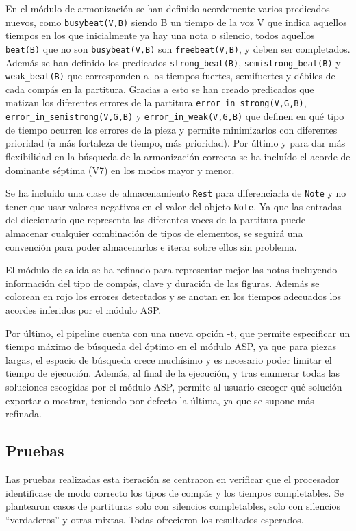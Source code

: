 En el módulo de armonización se han definido acordemente varios predicados nuevos, como \texttt{busybeat(V,B)} siendo B un tiempo de la voz V que indica aquellos tiempos en los que inicialmente ya hay una nota o silencio, todos aquellos \texttt{beat(B)} que no son \texttt{busybeat(V,B)} son \texttt{freebeat(V,B)}, y deben ser completados. Además se han definido los predicados \texttt{strong\_beat(B)}, \texttt{semistrong\_beat(B)} y \texttt{weak\_beat(B)} que corresponden a los tiempos fuertes, semifuertes y débiles de cada compás en la partitura. Gracias a esto se han creado predicados que matizan los diferentes errores de la partitura \texttt{error\_in\_strong(V,G,B)}, \texttt{error\_in\_semistrong(V,G,B)} y \texttt{error\_in\_weak(V,G,B)} que definen en qué tipo de tiempo ocurren los errores de la pieza y permite minimizarlos con diferentes prioridad (a más fortaleza de tiempo, más prioridad). Por último y para dar más flexibilidad en la búsqueda de la armonización correcta se ha incluído el acorde de dominante séptima (V7) en los modos mayor y menor.

Se ha incluido una clase de almacenamiento \texttt{Rest} para diferenciarla de \texttt{Note} y no tener que usar valores negativos en el valor del objeto \texttt{Note}. Ya que las entradas del diccionario que representa las diferentes voces de la partitura puede almacenar cualquier combinación de tipos de elementos, se seguirá una convención para poder almacenarlos e iterar sobre ellos sin problema.

El módulo de salida se ha refinado para representar mejor las notas incluyendo información del tipo de compás, clave y duración de las figuras. Además se colorean en rojo los errores detectados y se anotan en los tiempos adecuados los acordes inferidos por el módulo ASP.

Por último, el pipeline cuenta con una nueva opción -t, que permite especificar un tiempo máximo de búsqueda del óptimo en el módulo ASP, ya que para piezas largas, el espacio de búsqueda crece muchísimo y es necesario poder limitar el tiempo de ejecución. Además, al final de la ejecución, y tras enumerar todas las soluciones escogidas por el módulo ASP, permite al usuario escoger qué solución exportar o mostrar, teniendo por defecto la última, ya que se supone más refinada.

\subsection{Pruebas}
\label{subsec:fifth_iteration_test}
Las pruebas realizadas esta iteración se centraron en verificar que el procesador identificase de modo correcto los tipos de compás y los tiempos completables. Se plantearon casos de partituras solo con silencios completables, solo con silencios ``verdaderos'' y otras mixtas. Todas ofrecieron los resultados esperados.

